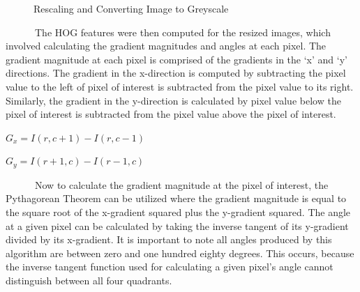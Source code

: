 \documentclass[
  letterpaper,
  DIV=11,
  numbers=noendperiod]{scrreprt}
\begin{document}
\begin{figure}

\begin{minipage}{\linewidth}



\end{minipage}%

\caption{\label{fig-input_image}Rescaling and Converting Image to
Greyscale}

\end{figure}%

~~~~~~The HOG features were then computed for the resized images, which
involved calculating the gradient magnitudes and angles at each pixel.
The gradient magnitude at each pixel is comprised of the gradients in
the `x' and `y' directions. The gradient in the x-direction is computed
by subtracting the pixel value to the left of pixel of interest is
subtracted from the pixel value to its right. Similarly, the gradient in
the y-direction is calculated by pixel value below the pixel of interest
is subtracted from the pixel value above the pixel of interest.

\(G_x=I(r,c+1)−I(r,c-1)\)

\(G_y=I(r+1,c)−I(r-1,c)\)

~~~~~~Now to calculate the gradient magnitude at the pixel of interest,
the Pythagorean Theorem can be utilized where the gradient magnitude is
equal to the square root of the x-gradient squared plus the y-gradient
squared. The angle at a given pixel can be calculated by taking the
inverse tangent of its y-gradient divided by its x-gradient. It is
important to note all angles produced by this algorithm are between zero
and one hundred eighty degrees. This occurs, because the inverse tangent
function used for calculating a given pixel's angle cannot distinguish
between all four quadrants.
\end{document}
